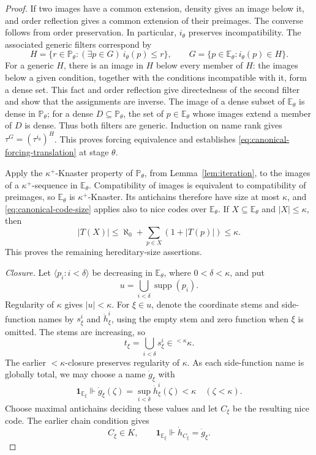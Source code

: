 \documentclass[11pt,a4paper]{amsart}
\theoremstyle{definition}
\theoremstyle{remark}
\newcommand{\PP}{\mathbb P}
\newcommand{\EE}{\mathbb E}
\DeclareMathOperator{\supp}{supp}
\begin{document}
\begin{proof}
If two images have a common extension, density gives an
image below it, and order reflection gives a common
extension of their preimages. The converse follows from
order preservation. In particular, \(i_\theta\)
preserves incompatibility. The associated generic filters
correspond by
\[
 H=\{r\in\PP_\theta:(\exists p\in G)\ i_\theta(p)\leq r\},
 \qquad G=\{p\in\EE_\theta:i_\theta(p)\in H\}.
\]
For a generic \(H\), there is an image in \(H\) below
every member of \(H\): the images below a given condition,
together with the conditions incompatible with it, form a
dense set. This fact and order reflection give directedness
of the second filter and show that the assignments are
inverse. The image of a dense subset of \(\EE_\theta\)
is dense in \(\PP_\theta\); for a dense
\(D\subseteq\PP_\theta\), the set of \(p\in\EE_\theta\)
whose images extend a member of \(D\) is dense. Thus both
filters are generic. Induction on name rank gives
\(\tau^G=(\tau^{i_\theta})^H\). This proves forcing
equivalence and establishes
\eqref{eq:canonical-forcing-translation} at stage
\(\theta\).

Apply the \(\kappa^+\)-Knaster property of
\(\PP_\theta\), from Lemma~\ref{lem:iteration}, to
the images of a \(\kappa^+\)-sequence in \(\EE_\theta\).
Compatibility of images is equivalent to compatibility
of preimages, so \(\EE_\theta\) is
\(\kappa^+\)-Knaster. Its antichains therefore have
size at most \(\kappa\), and
\eqref{eq:canonical-code-size} applies also to nice
codes over \(\EE_\theta\). If
\(X\subseteq\EE_\theta\) and \(|X|\leq\kappa\), then
\[
 |T(X)|\leq\aleph_0+\sum_{p\in X}(1+|T(p)|)
                           \leq\kappa.
\]
This proves the remaining hereditary-size assertions.

\emph{Closure.}
Let \(\langle p_i:i<\delta\rangle\) be decreasing in
\(\EE_\theta\), where \(0<\delta<\kappa\), and put
\[
 u=\bigcup_{i<\delta}\supp(p_i).
\]
Regularity of \(\kappa\) gives \(|u|<\kappa\).
For \(\xi\in u\), denote the coordinate stems and
side-function names by \(s_\xi^i\) and
\(\dot h_\xi^i\), using the empty stem and zero
function when \(\xi\) is omitted. The stems are
increasing, so
\[
 t_\xi=\bigcup_{i<\delta}s_\xi^i\in{}^{<\kappa}\kappa.
\]
The earlier \(<\kappa\)-closure preserves regularity
of \(\kappa\). As each side-function name is globally
total, we may choose a name \(\dot g_\xi\) with
\[
 \mathbf1_{\EE_\xi}\Vdash
 \dot g_\xi(\zeta)=\sup_{i<\delta}\dot h_\xi^i(\zeta)<\kappa
                                      \quad(\zeta<\kappa).
\]
Choose maximal antichains deciding these values and let
\(C_\xi\) be the resulting nice code. The earlier
chain condition gives
\[
 C_\xi\in K,\qquad
 \mathbf1_{\EE_\xi}\Vdash\dot h_{C_\xi}=\dot g_\xi.
\]


\end{proof}
\end{document}
